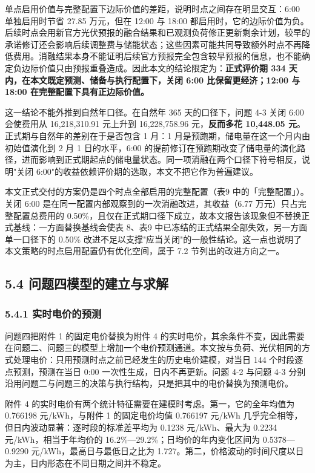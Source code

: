 \documentclass[12pt,a4paper]{ctexart}
\begin{document}
单点启用价值与完整配置下边际价值的差距，说明时点之间存在明显交互：6:00 单独启用时节省 27.85 万元，但在 12:00 与 18:00 都启用时，它的边际价值为负。后续时点会用新官方光伏预报的融合结果和已观测负荷修正更新剩余计划，较早的承诺修订还会影响后续调整费与储能状态；这些因素可能共同导致额外时点不再降低费用。消融结果本身不能证明后续官方预报完全包含较早预报的信息，也不能确定负边际价值只由预报重叠造成。因此本文的结论限定为：\textbf{正式评价期 334 天内，在本文既定预测、储备与执行配置下，关闭 6:00 比保留更经济；12:00 与 18:00 在完整配置下具有正边际价值。}

这一结论不能外推到自然年口径。在自然年 365 天的口径下，问题 4-3 关闭 6:00 会使费用从 16,218,310.91 元上升到 16,228,758.96 元，\textbf{反而多花 10,448.05 元}。正式期与自然年的差别在于是否包含 1 月：1 月是预跑期，储电量在这一个月内由初始值演化到 2 月 1 日的水平，6:00 的提前修订在预跑期改变了储电量的演化路径，进而影响到正式期起点的储电量状态。同一项消融在两个口径下符号相反，说明"关闭 6:00"的收益依赖评价期的选取，本文不把它作为普遍建议。

本文正式交付的方案仍是四个时点全部启用的完整配置（表9 中的「完整配置」）。关闭 6:00 是在同一配置内部观察到的一次消融改进，其收益（6.77 万元）只占完整配置总费用的 0.50\%，且仅在正式期口径下成立，故本文报告该现象但不替换正式基线：一方面替换基线会使表 8、表9 中已冻结的正式结果全部失效，另一方面单一口径下的 0.50\% 改进不足以支撑"应当关闭"的一般性结论。这一点也说明了本文策略的时点启用配置仍有优化空间，属于 7.2 节列出的改进方向之一。

\subsection*{5.4 问题四模型的建立与求解}

\subsubsection*{5.4.1 实时电价的预测}

问题四把附件 1 的固定电价替换为附件 4 的实时电价，其余条件不变，因此需要在问题二、问题三的模型上增加一个电价预测通道。本文按与负荷、光伏相同的方式处理电价：只用预测时点之前已经发生的历史电价建模，对当日 144 个时段逐点预测，预测在当日 0:00 一次性生成，日内不再更新。问题 4-2 与问题 4-3 分别沿用问题二与问题三的决策与执行结构，只是把其中的电价替换为预测电价。

附件 4 的实时电价有两个统计特征需要在建模时考虑。第一，它的全年均值为 0.766198 元/kWh，与附件 1 的固定电价均值 0.766197 元/kWh 几乎完全相等，但日内波动显著：逐时段的标准差平均为 0.1238 元/kWh、最大为 0.2234 元/kWh，相当于年均价的 16.2\%—29.2\%；日均价的年内变化区间为 0.5378—0.9290 元/kWh，最高日与最低日之比为 1.727。第二，价格波动的时间尺度以日为主，日内形态在不同日期之间并不稳定。
\end{document}
